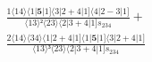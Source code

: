 \documentclass[varwidth, border=5pt]{standalone}
\begin{document}
\begin{my}
$\begin{gathered}
\scriptscriptstyle\frac{1⟨14⟩⟨1|𝟓|1]⟨3|2+4|1]⟨4|2-3|1]}{⟨13⟩²⟨23⟩⟨2|3+4|1]s_{234}} +\\
\scriptscriptstyle\frac{2⟨14⟩⟨34⟩⟨1|2+4|1]⟨1|𝟓|1]⟨3|2+4|1]}{⟨13⟩³⟨23⟩⟨2|3+4|1]s_{234}} \phantom{+}
\end{gathered}$
\end{my}
\end{document}
